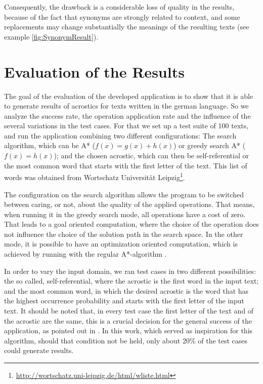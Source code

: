 \documentclass[11pt]{reportAlternative}
\begin{document}
Consequently, the drawback is a considerable loss of quality in the results, because of the fact that synonyms are strongly related to context, and some replacements may change substantially the meanings of the resulting texts (see example \ref{fig:SynonymResult}).


\chapter{Evaluation of the Results}
The goal of the evaluation of the developed application is to show that it is able to generate results of acrostics for texts written in the german language. So we analyze the success rate, the operation application rate and the influence of the several variations in the test cases. For that we set up a test suite of 100 texts, and run the application combining two different configurations: The search algorithm, which can be A* ($f(x) = g(x) + h(x)$) or greedy search A* ($f(x) = h(x)$); and the chosen acrostic, which can then be self-referential or the most common word that starts with the first letter of the text. This list of words was obtained from Wortschatz Universität Leipzig\footnote{\url{http://wortschatz.uni-leipzig.de/html/wliste.html}}.

The configuration on the search algorithm allows the program to be switched between caring, or not, about the quality of the applied operations. That means, when running it in the greedy search mode, all operations have a cost of zero. That leads to a goal oriented computation, where the choice of the operation does not influence the choice of the solution path in the search space. In the other mode, it is possible to have an optimization oriented computation, which is achieved by running with the regular A*-algorithm \cite{AStar}.

In order to vary the input domain, we ran test cases in two different possibilities: the so called, self-referential, where the acrostic is the first word in the input text; and the most common word, in which the desired acrostic is the word that has the highest occurrence probability and starts with the first letter of the input text. It should be noted that, in every test case the first letter of the text and of the acrostic are the same, this is a crucial decision for the general success of the application, as pointed out in \cite{Stein}. In this work, which served as inspiration for this algorithm, should that condition not be held, only about 20\% of the test cases could generate results.
\end{document}
